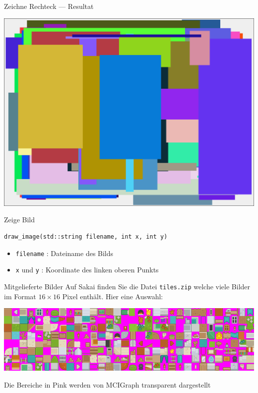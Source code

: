 \documentclass[presentation]{beamer}
\begin{document}
\begin{frame}[label={sec:orgb376a6f}]{Zeichne Rechteck --- Resultat}
\begin{center}\begin{center}
\includegraphics[width=.9\linewidth]{data/74/625dc0-aca5-4a77-8341-259d37547f94/screenshot-20170316-143436.png}
\end{center}\end{center}
\end{frame}
\begin{frame}[label={sec:org1be8bb6},fragile]{Zeige Bild}
 \begin{verbatim}
draw_image(std::string filename, int x, int y)
\end{verbatim}
\begin{itemize}
\item {\color{solarizedYellow}\texttt{filename} }: Dateiname des Bilds
\item {\color{solarizedYellow}\texttt{x} }und {\color{solarizedYellow}\texttt{y} }: Koordinate des linken oberen Punkts
\end{itemize}
\begin{block}{Mitgelieferte Bilder}
Auf Sakai finden Sie die Datei {\color{solarizedYellow}\texttt{tiles.zip} }welche viele Bilder im
Format \(16 \times 16\) Pixel enthält. Hier eine Auswahl:
\begin{center}\begin{center}
\includegraphics[width=.9\linewidth]{tiles.png}
\end{center}\end{center}
Die Bereiche in Pink werden von MCIGraph transparent dargestellt
\end{block}
\end{frame}
\end{document}
